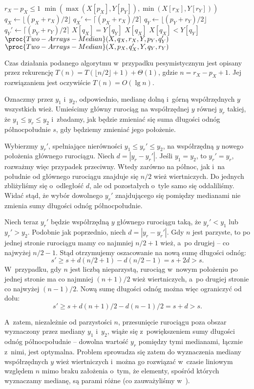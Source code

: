 \begin{codebox}
\li	\If $r_X-p_X\le1$
\li		\Then \Return $\min(\max(X[p_X],Y[p_Y]),\min(X[r_X],Y[r_Y]))$
		\End
\li	$q_X\gets\lfloor(p_X+r_X)/2\rfloor$
\li	$q_X'\gets\lceil(p_X+r_X)/2\rceil$
\li	$q_Y\gets\lfloor(p_Y+r_Y)/2\rfloor$
\li	$q_Y'\gets\lceil(p_Y+r_Y)/2\rceil$
\li	\If $X[q_X]=Y[q_Y]$
\li		\Then \Return $X[q_X]$
		\End
\li	\If $X[q_X]<Y[q_Y]$
\li		\Then \Return $\proc{Two-Arrays-Median}(X,q_X,r_X,Y,p_Y,q_Y')$
\li		\Else \Return $\proc{Two-Arrays-Median}(X,p_X,q_X',Y,q_Y,r_Y)$
		\End
\end{codebox}

Czas działania podanego algorytmu w~przypadku pesymistycznym jest opisany przez rekurencję $T(n)=T(\lfloor n/2\rfloor+1)+\Theta(1)$, gdzie $n=r_X-p_X+1$.
Jej rozwiązaniem jest oczywiście $T(n)=O(\lg n)$.

\exercise %
Oznaczmy przez $y_1$ i~$y_2$, odpowiednio, medianę dolną i~górną współrzędnych $y$ wszystkich wież.
Umieścimy główny rurociąg na współrzędnej $y$ równej $y_r$ takiej, że $y_1\le y_r\le y_2$ i~zbadamy, jak będzie zmieniać się suma długości odnóg północ\nbhyphen południe $s$, gdy będziemy zmieniać jego położenie.

Wybierzmy $y_r'$, spełniające nierówności $y_1\le y_r'\le y_2$, na współrzędną $y$ nowego położenia głównego rurociągu.
Niech $d=|y_r-y_r'|$.
Jeśli $y_1=y_2$, to $y_r'=y_r$, rozważmy więc przypadek przeciwny.
Wtedy zarówno na północ, jak i~na południe od głównego rurociągu znajduje się $n/2$ wież wiertniczych.
Do jednych zbliżyliśmy się o~odległość $d$, ale od pozostałych o~tyle samo się oddaliliśmy.
Widać stąd, że wybór dowolnego $y_r'$ znajdującego się pomiędzy medianami nie zmienia sumy długości odnóg północ\nbhyphen południe.

Niech teraz $y_r'$ będzie współrzędną $y$ głównego rurociągu taką, że $y_r'<y_1$ lub $y_r'>y_2$.
Podobnie jak poprzednio, niech $d=|y_r-y_r'|$.
Gdy $n$ jest parzyste, to po jednej stronie rurociągu mamy co najmniej $n/2+1$ wież, a~po drugiej -- co najwyżej $n/2-1$.
Stąd otrzymujemy oszacowanie na nową sumę długości odnóg:
\[
    s' \ge s+d(n/2+1)-d(n/2-1) = s+2d > s.
\]
W~przypadku, gdy $n$ jest liczbą nieparzystą, rurociąg w~nowym położeniu po jednej stronie ma co najmniej $(n+1)/2$ wież wiertniczych, a~po drugiej stronie co najwyżej $(n-1)/2$.
Nową sumę długości odnóg można więc ograniczyć od dołu:
\[
    s' \ge s+d(n+1)/2-d(n-1)/2 = s+d > s.
\]

A~zatem, niezależnie od parzystości $n$, przesunięcie rurociągu poza obszar wyznaczony przez mediany $y_1$ i~$y_2$, wiąże się z~powiększeniem sumy długości odnóg północ\nbhyphen południe -- dowolna wartość $y_r$ pomiędzy tymi medianami, łącznie z~nimi, jest optymalna.
Problem sprowadza się zatem do wyznaczenia mediany współrzędnych $y$ wież wiertniczych i~można go rozwiązać w~czasie liniowym względem $n$ mimo braku założenia o~tym, że elementy, spośród których wyznaczamy medianę, są parami różne (co zauważyliśmy w~).
